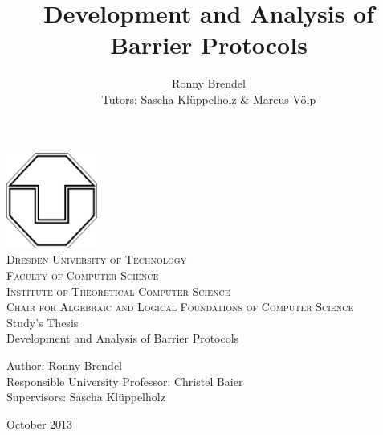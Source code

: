 \documentclass[a4paper, 10pt]{article}
\title{Development and Analysis of Barrier Protocols}
\author{Ronny Brendel\\Tutors: Sascha Kl\"uppelholz \& Marcus V\"olp}
\begin{document}
\begin{titlepage}

\begin{center}
\includegraphics[width=3cm]{tu-logo}~\\[1cm]
\textsc{\LARGE Dresden University of Technology}\\[0.5cm]
\textsc{\Large Faculty of Computer Science}\\[0.2cm]
\textsc{\large Institute of Theoretical Computer Science}\\[0.2cm]
\textsc{\large Chair for Algebraic and Logical Foundations of Computer Science}\\[3cm]
\Huge Study's Thesis \\[1cm]
\huge Development and Analysis of Barrier Protocols\\[3cm]
\end{center}

\begin{flushleft} \large
	Author: Ronny Brendel \\
	Responsible University Professor: Christel Baier \\
	Supervisors: Sascha Kl\"uppelholz
\end{flushleft}

\vfill
\begin{flushright}
	\large October 2013
\end{flushright}

\end{titlepage}

\pagebreak
\newpage \thispagestyle{empty} \mbox{}
\pagebreak

\thispagestyle{empty}
\end{document}
